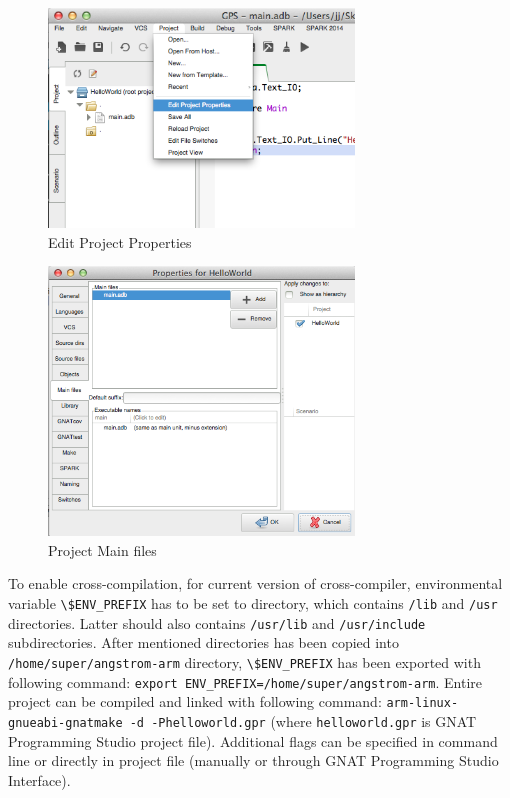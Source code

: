 \begin{figure}[ht]%
    \begin{center}
    	\includegraphics[width=3.2in]{figures/EditProjectProperties.png}    	
    \end{center}
    \caption{Edit Project Properties}
    \label{figure:editprojectproperties}
\end{figure}

\begin{figure}[ht]%
    \begin{center}
    	\includegraphics[width=3.2in]{figures/Properties-MainFiles.png}    	
    \end{center}
    \caption{Project Main files}
    \label{figure:mainfiles}
\end{figure}

To enable cross-compilation, for current version of cross-compiler, environmental variable \lstinline{\$ENV_PREFIX} has to be set to directory, which contains \lstinline{/lib} and \lstinline{/usr} directories. Latter should also contains \lstinline{/usr/lib} and \lstinline{/usr/include} subdirectories. After mentioned directories has been copied into \lstinline{/home/super/angstrom-arm} directory, \lstinline{\$ENV_PREFIX} has been exported with following command: \lstinline{export ENV_PREFIX=/home/super/angstrom-arm}. Entire project can be compiled and linked with following command: \lstinline{arm-linux-gnueabi-gnatmake -d -Phelloworld.gpr} (where \lstinline{helloworld.gpr} is GNAT Programming Studio project file). Additional flags can be specified in command line or directly in project file (manually or through GNAT Programming Studio Interface).

